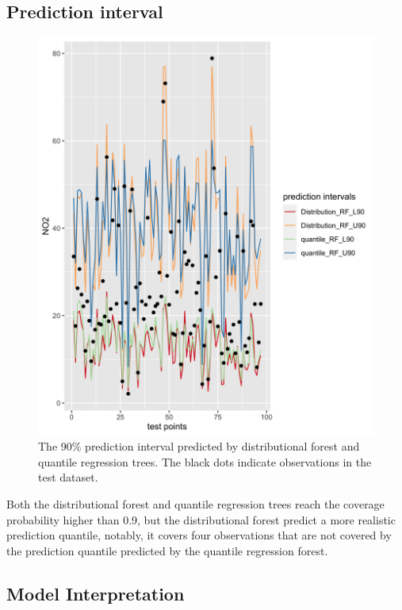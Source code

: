 \documentclass{article}
\begin{document}
\subsection{Prediction interval}
\label{sec:predinterval}
\begin{figure}
\centering
\includegraphics[scale = 0.2]{fig/dist_vs_qrf.png}
\caption{The 90\% prediction interval predicted by distributional forest and quantile regression trees. The black dots indicate observations in the test dataset.}
\label{distvsquant}
\end{figure}

Both the distributional forest and quantile regression trees reach the coverage probability higher than 0.9, but the distributional forest predict a more realistic prediction quantile, notably, it covers four observations that are not covered by the prediction quantile predicted by the quantile regression forest. 

\subsection{Model Interpretation} 
\end{document}
